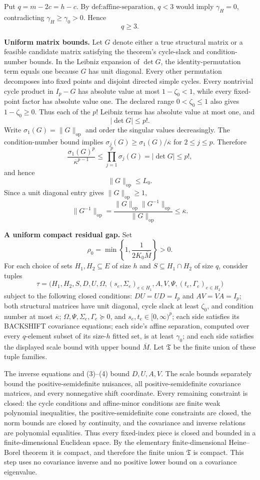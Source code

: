 Put \(q=m-2c=h-c\). By \(\text{def:affine-separation}\), \(q<3\) would imply \(\gamma_H=0\), contradicting \(\gamma_H\geq\gamma_0>0\). Hence
\[
q\geq3.
\tag{1}
\]

\textbf{Uniform matrix bounds.}
Let \(G\) denote either a true structural matrix or a feasible candidate matrix satisfying the theorem's cycle-slack and condition-number bounds. In the Leibniz expansion of \(\det G\), the identity-permutation term equals one because \(G\) has unit diagonal. Every other permutation decomposes into fixed points and disjoint directed simple cycles. Every nontrivial cycle product in \(I_p-G\) has absolute value at most \(1-\zeta_0<1\), while every fixed-point factor has absolute value one. The declared range \(0<\zeta_0\leq1\) also gives \(1-\zeta_0\geq0\). Thus each of the \(p!\) Leibniz terms has absolute value at most one, and
\[
|\det G|\leq p!.
\tag{2}
\]
Write \(\sigma_1(G)=\|G\|_{\mathrm{op}}\) and order the singular values decreasingly. The condition-number bound implies \(\sigma_j(G)\geq\sigma_1(G)/\overline\kappa\) for \(2\leq j\leq p\). Therefore
\[
\frac{\sigma_1(G)^p}{\overline\kappa^{p-1}}
\leq\prod_{j=1}^p\sigma_j(G)
=|\det G|
\leq p!,
\]
and hence
\[
\|G\|_{\mathrm{op}}\leq L_0.
\tag{3}
\]
Since a unit diagonal entry gives \(\|G\|_{\mathrm{op}}\geq1\),
\[
\|G^{-1}\|_{\mathrm{op}}
=\frac{\|G\|_{\mathrm{op}}\|G^{-1}\|_{\mathrm{op}}}
{\|G\|_{\mathrm{op}}}
\leq\overline\kappa.
\tag{4}
\]

\textbf{A uniform compact residual gap.}
Set
\[
\rho_0=\min\left\{1,\frac{1}{2K_0\overline M}\right\}>0.
\tag{5}
\]
For each choice of sets \(H_1,H_2\subseteq E\) of size \(h\) and \(S\subseteq H_1\cap H_2\) of size \(q\), consider tuples
\[
\tau=\bigl(H_1,H_2,S,D,U,\Omega,(s_e,\Sigma_e)_{e\in H_1},
A,V,\Psi,(t_e,\Gamma_e)_{e\in H_2}\bigr)
\]
subject to the following closed conditions: \(DU=UD=I_p\) and \(AV=VA=I_p\); both structural matrices have unit diagonal, cycle slack at least \(\zeta_0\), and condition number at most \(\overline\kappa\); \(\Omega,\Psi,\Sigma_e,\Gamma_e\succeq0\), and \(s_e,t_e\in[0,\infty)^p\); each side satisfies its BACKSHIFT covariance equations; each side's affine separation, computed over every \(q\)-element subset of its size-\(h\) fitted set, is at least \(\gamma_0\); and each side satisfies the displayed scale bound with upper bound \(\overline M\). Let \(\mathfrak T\) be the finite union of these tuple families.

The inverse equations and (3)--(4) bound \(D,U,A,V\). The scale bounds separately bound the positive-semidefinite nuisances, all positive-semidefinite covariance matrices, and every nonnegative shift coordinate. Every remaining constraint is closed: the cycle conditions and affine-minor conditions are finite weak polynomial inequalities, the positive-semidefinite cone constraints are closed, the norm bounds are closed by continuity, and the covariance and inverse relations are polynomial equalities. Thus every fixed-index piece is closed and bounded in a finite-dimensional Euclidean space. By the elementary finite-dimensional Heine--Borel theorem it is compact, and therefore the finite union \(\mathfrak T\) is compact. This step uses no covariance inverse and no positive lower bound on a covariance eigenvalue.

